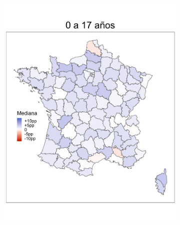 \begin{figure}
	\centering
	\begin{subfigure}{0.3\textwidth}
	\includegraphics[width = \textwidth]{Figs/Efectos/Mapa_Efectos_Ed1_Modelo_H}
	\end{subfigure}
	~
	\begin{subfigure}{0.3\textwidth}

\end{subfigure}
\end{figure}
